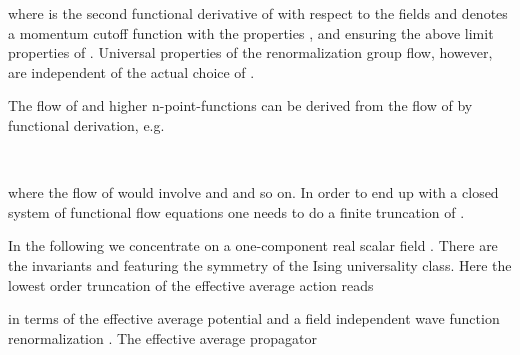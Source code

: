 \documentclass[a4paper,aps,prl,twocolumn,groupedaddress]{revtex4}
\begin{document}
\bigskip {}\coordHE{}

\bigskip
\noindent
where \coordHE{} is the second functional derivative of \coordHE{} with respect to the
fields and \coordHE{} denotes a momentum cutoff function with the properties \coordHE{},
\coordHE{} and \coordHE{} ensuring the above limit
properties of \coordHE{}. Universal properties of the renormalization group flow, however, are
independent of the actual choice of \coordHE{}.

\bigskip
\noindent
The flow of \coordHE{} and higher n-point-functions can be derived from the flow of
\coordHE{} by functional derivation, e.g.

\bigskip {}\coordHE{} \\
\coordHE{}

\bigskip
\noindent
where the flow of \coordHE{} would involve \coordHE{} and \coordHE{} and so on.
In order to end up with a closed system of functional flow equations one needs to do a finite
truncation of \coordHE{}.

\bigskip
\noindent
In the following we concentrate on a one-component real scalar field \coordHE{}. There are the invariants \coordHE{} and
\coordHE{} featuring the \coordHE{} symmetry of
the Ising universality class. Here the lowest order truncation of the effective average action
reads

\bigskip {}\coordHE{}

\bigskip
\noindent
in terms of the effective average potential \coordHE{} and a field independent
wave function renormalization \coordHE{}. The effective average propagator
\end{document}
